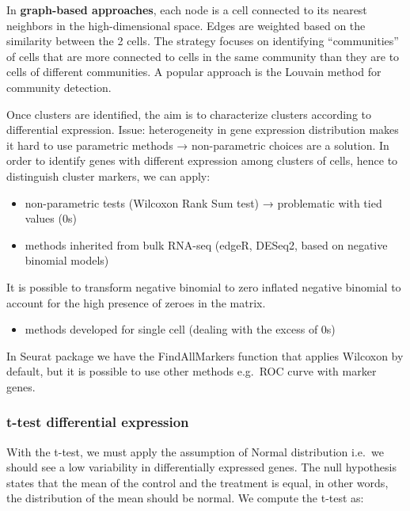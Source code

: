 In \textbf{graph-based approaches}, each node is a cell connected to its
nearest neighbors in the high-dimensional space. Edges are weighted
based on the similarity between the 2 cells. The strategy focuses on
identifying ``communities'' of cells that are more connected to cells in
the same community than they are to cells of different communities. A
popular approach is the Louvain method for community detection.

Once clusters are identified, the aim is to characterize clusters
according to differential expression. Issue: heterogeneity in gene
expression distribution makes it hard to use parametric methods →
non-parametric choices are a solution. In order to identify genes with
different expression among clusters of cells, hence to distinguish
cluster markers, we can apply:

\begin{itemize}
\tightlist
\item
  non-parametric tests (Wilcoxon Rank Sum test) → problematic with tied
  values (0s)
\item
  methods inherited from bulk RNA-seq (edgeR, DESeq2, based on negative
  binomial models)
\end{itemize}

It is possible to transform negative binomial to zero inflated negative binomial to
account for the high presence of zeroes in the matrix. 

\begin{itemize}
\tightlist
\item
  methods developed for single cell (dealing with the excess of 0s)
\end{itemize}

In Seurat package we have the FindAllMarkers function that applies Wilcoxon by default,
but it is possible to use other methods e.g.~ROC curve with marker
genes.

\hypertarget{t-test-differential-expression}{%
\subsubsection{t-test differential
expression}\label{t-test-differential-expression}}

With the t-test, we must apply the assumption of Normal distribution
i.e.~we should see a low variability in differentially expressed genes.
The null hypothesis states that the mean of the control and the
treatment is equal, in other words, the distribution of the mean should
be normal. We compute the t-test as:

